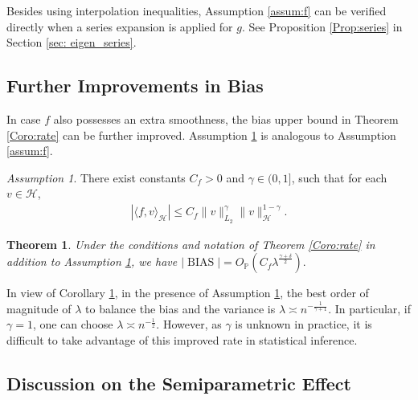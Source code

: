 \documentclass[12pt]{article}
\theoremstyle{plain}
\newtheorem{theorem}{Theorem}
\theoremstyle{remark}
\newtheorem{assumption}{Assumption}
\begin{document}
Besides using interpolation inequalities, Assumption \ref{assum:f} can be verified directly when a series expansion is applied for $g$. See Proposition \ref{Prop:series} in Section \ref{sec: eigen_series}.

\subsection{Further Improvements in Bias}\label{sec:further}

In case $f$ also possesses an extra smoothness, the bias upper bound in Theorem \ref{Coro:rate} can be further improved. Assumption \ref{assum:further} is analogous to Assumption \ref{assum:f}.

\begin{assumption}\label{assum:further}
    There exist constants $C_f>0$ and $\gamma\in(0,1]$, such that for each $v\in\mathcal{H}$,
    \begin{eqnarray}\label{smoothnessf}
        |\langle f,v\rangle_{\mathcal{H}}|\leq C_f\|v\|^{\gamma}_{L_2}\|v\|^{1-\gamma}_{\mathcal{H}}.
    \end{eqnarray}
\end{assumption}

\begin{theorem}\label{Coro:further}
    Under the conditions and notation of Theorem \ref{Coro:rate} in addition to Assumption \ref{assum:further}, we have
    $|\operatorname{BIAS}|=O_\mathbb{P}(C_f\lambda^\frac{\gamma+\delta}{2}).$  
\end{theorem}

In view of Corollary \ref{Coro:further}, in the presence of Assumption \ref{assum:further}, the best order of magnitude of $\lambda$ to balance the bias and the variance is $\lambda\asymp n^{-\frac{1}{\gamma+1}}$. In particular, if $\gamma=1$, one can choose $\lambda\asymp n^{-\frac{1}{2}}$. However, as $\gamma$ is unknown in practice, it is difficult to take advantage of this improved rate in statistical inference.

\subsection{Discussion on the Semiparametric Effect}\label{sec:semiparametric}
\end{document}
